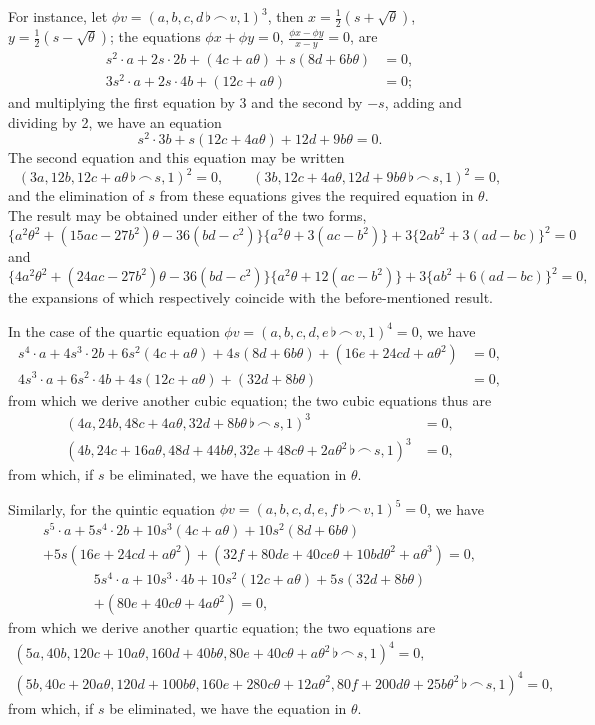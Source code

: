 \documentclass[11pt,a4paper]{article}
\theoremstyle{definition}
\begin{document}
For instance, let $\phi v=(a,b,c,d\,\flat\,\frown\, v,1)^3$, then $x=\tfrac{1}{2}(s+\sqrt{\theta})$, $y=\tfrac{1}{2}(s-\sqrt{\theta})$; the equations $\phi x+\phi y=0$, $\frac{\phi x-\phi y}{x-y}=0$, are
\begin{align*}
s^2\cdot a+2s\cdot 2b+(4c+a\theta)+s(8d+6b\theta) &= 0,\\
3s^2\cdot a+2s\cdot 4b+(12c+a\theta) &= 0;
\end{align*}
and multiplying the first equation by 3 and the second by $-s$, adding and dividing by 2, we have an equation
\[
s^2\cdot 3b+s(12c+4a\theta)+12d+9b\theta=0.
\]
The second equation and this equation may be written
\[
(3a,12b,12c+a\theta\,\flat\,\frown\, s,1)^2=0,\qquad (3b,12c+4a\theta,12d+9b\theta\,\flat\,\frown\, s,1)^2=0,
\]
and the elimination of $s$ from these equations gives the required equation in $\theta$. The result may be obtained under either of the two forms,
\[
\{a^2\theta^2+(15ac-27b^2)\theta-36(bd-c^2)\}\{a^2\theta+3(ac-b^2)\}+3\{2ab^2+3(ad-bc)\}^2=0
\]
and
\[
\{4a^2\theta^2+(24ac-27b^2)\theta-36(bd-c^2)\}\{a^2\theta+12(ac-b^2)\}+3\{ab^2+6(ad-bc)\}^2=0,
\]
the expansions of which respectively coincide with the before-mentioned result.

In the case of the quartic equation $\phi v=(a,b,c,d,e\,\flat\,\frown\, v,1)^4=0$, we have
\begin{align*}
s^4\cdot a+4s^3\cdot 2b+6s^2(4c+a\theta)+4s(8d+6b\theta)+(16e+24cd+a\theta^2) &= 0,\\
4s^3\cdot a+6s^2\cdot 4b+4s(12c+a\theta)+(32d+8b\theta) &= 0,
\end{align*}
from which we derive another cubic equation; the two cubic equations thus are
\begin{align*}
(4a,24b,48c+4a\theta,32d+8b\theta\,\flat\,\frown\, s,1)^3 &= 0,\\
(4b,24c+16a\theta,48d+44b\theta,32e+48c\theta+2a\theta^2\,\flat\,\frown\, s,1)^3 &= 0,
\end{align*}
from which, if $s$ be eliminated, we have the equation in $\theta$.

Similarly, for the quintic equation $\phi v=(a,b,c,d,e,f\,\flat\,\frown\, v,1)^5=0$, we have
\begin{multline*}
s^5\cdot a+5s^4\cdot 2b+10s^3(4c+a\theta)+10s^2(8d+6b\theta)\\
+5s(16e+24cd+a\theta^2)+(32f+80de+40ce\theta+10bd\theta^2+a\theta^3)=0,
\end{multline*}
\begin{multline*}
5s^4\cdot a+10s^3\cdot 4b+10s^2(12c+a\theta)+5s(32d+8b\theta)\\
+(80e+40c\theta+4a\theta^2)=0,
\end{multline*}
from which we derive another quartic equation; the two equations are
\begin{multline*}
(5a,40b,120c+10a\theta,160d+40b\theta,80e+40c\theta+a\theta^2\,\flat\,\frown\, s,1)^4=0,\\
(5b,40c+20a\theta,120d+100b\theta,160e+280c\theta+12a\theta^2,80f+200d\theta+25b\theta^2\,\flat\,\frown\, s,1)^4=0,
\end{multline*}
from which, if $s$ be eliminated, we have the equation in $\theta$.
\end{document}
